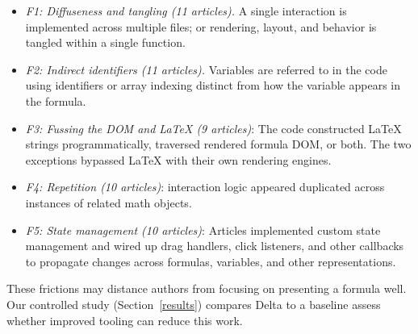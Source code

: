 \begin{itemize}
\item \emph{F1: Diffuseness and tangling (11 articles).} A single interaction is implemented across multiple files; or rendering, layout, and behavior is tangled within a single function.
\item \emph{F2: Indirect identifiers (11 articles).} Variables are referred to in the code using identifiers or array indexing distinct from how the variable appears in the formula.
\item \emph{F3: Fussing the DOM and LaTeX (9 articles)}: The code constructed \LaTeX{} strings programmatically, traversed rendered formula DOM, or both. The two exceptions bypassed LaTeX with their own rendering engines.
\item\emph{F4: Repetition (10 articles)}: interaction logic appeared duplicated across instances of related math objects.
\item\emph{F5: State management (10 articles)}: Articles implemented custom state management and wired up drag handlers, click listeners, and other callbacks to propagate changes across formulas, variables, and other representations.
\end{itemize}

These frictions may distance authors from focusing on presenting a formula well. Our controlled study (Section~\ref{results}) compares Delta to a baseline assess whether improved tooling can reduce this work.